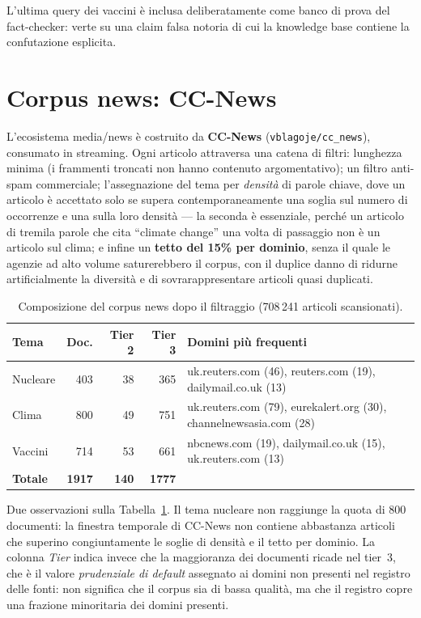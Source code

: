 \documentclass[11pt,a4paper]{report}
\begin{document}
L'ultima query dei vaccini è inclusa deliberatamente come banco di prova del fact-checker:
verte su una claim falsa notoria di cui la knowledge base contiene la confutazione esplicita.

\section{Corpus news: CC-News}
L'ecosistema media/news è costruito da \textbf{CC-News} (\texttt{vblagoje/cc\_news}), consumato
in streaming. Ogni articolo attraversa una catena di filtri: lunghezza minima (i frammenti
troncati non hanno contenuto argomentativo); un filtro anti-spam commerciale; l'assegnazione del
tema per \emph{densità} di parole chiave, dove un articolo è accettato solo se supera
contemporaneamente una soglia sul numero di occorrenze e una sulla loro densità --- la seconda è
essenziale, perché un articolo di tremila parole che cita ``climate change'' una volta di
passaggio non è un articolo sul clima; e infine un \textbf{tetto del 15\% per dominio}, senza il
quale le agenzie ad alto volume saturerebbero il corpus, con il duplice danno di ridurne
artificialmente la diversità e di sovrarappresentare articoli quasi duplicati.

\begin{table}[t]
\centering
\small
\begin{tabularx}{\textwidth}{lrrrX}
\toprule
\textbf{Tema} & \textbf{Doc.} & \textbf{Tier 2} & \textbf{Tier 3} & \textbf{Domini più frequenti} \\
\midrule
Nucleare & 403 & 38 & 365 & uk.reuters.com (46), reuters.com (19), dailymail.co.uk (13) \\
Clima & 800 & 49 & 751 & uk.reuters.com (79), eurekalert.org (30), channelnewsasia.com (28) \\
Vaccini & 714 & 53 & 661 & nbcnews.com (19), dailymail.co.uk (15), uk.reuters.com (13) \\
\midrule
\textbf{Totale} & \textbf{1917} & \textbf{140} & \textbf{1777} & \\
\bottomrule
\end{tabularx}
\caption{Composizione del corpus news dopo il filtraggio (708\,241 articoli scansionati).}
\label{tab:corpus-news}
\end{table}

Due osservazioni sulla Tabella~\ref{tab:corpus-news}. Il tema nucleare non raggiunge la quota di
800 documenti: la finestra temporale di CC-News non contiene abbastanza articoli che superino
congiuntamente le soglie di densità e il tetto per dominio. La colonna \emph{Tier} indica invece
che la maggioranza dei documenti ricade nel tier~3, che è il valore \emph{prudenziale di default}
assegnato ai domini non presenti nel registro delle fonti: non significa che il corpus sia di
bassa qualità, ma che il registro copre una frazione minoritaria dei domini presenti.
\end{document}
